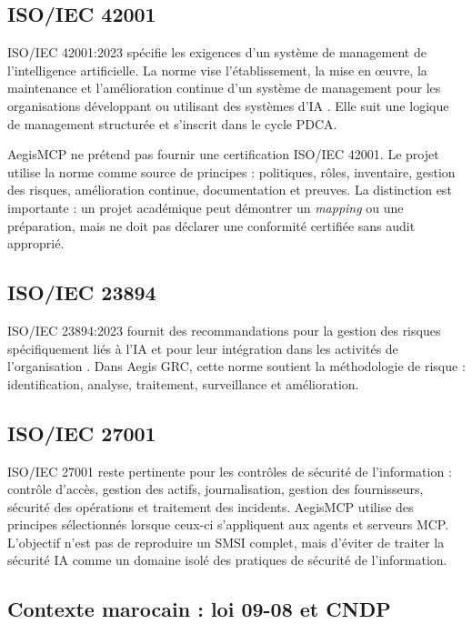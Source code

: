 \subsection{ISO/IEC 42001}

ISO/IEC 42001:2023 spécifie les exigences d'un système de management de l'intelligence artificielle. La norme vise l'établissement, la mise en œuvre, la maintenance et l'amélioration continue d'un système de management pour les organisations développant ou utilisant des systèmes d'IA \cite{iso42001}. Elle suit une logique de management structurée et s'inscrit dans le cycle PDCA.

AegisMCP ne prétend pas fournir une certification ISO/IEC 42001. Le projet utilise la norme comme source de principes : politiques, rôles, inventaire, gestion des risques, amélioration continue, documentation et preuves. La distinction est importante : un projet académique peut démontrer un \emph{mapping} ou une préparation, mais ne doit pas déclarer une conformité certifiée sans audit approprié.

\subsection{ISO/IEC 23894}

ISO/IEC 23894:2023 fournit des recommandations pour la gestion des risques spécifiquement liés à l'IA et pour leur intégration dans les activités de l'organisation \cite{iso23894}. Dans Aegis GRC, cette norme soutient la méthodologie de risque : identification, analyse, traitement, surveillance et amélioration.

\subsection{ISO/IEC 27001}

ISO/IEC 27001 reste pertinente pour les contrôles de sécurité de l'information : contrôle d'accès, gestion des actifs, journalisation, gestion des fournisseurs, sécurité des opérations et traitement des incidents. AegisMCP utilise des principes sélectionnés lorsque ceux-ci s'appliquent aux agents et serveurs MCP. L'objectif n'est pas de reproduire un SMSI complet, mais d'éviter de traiter la sécurité IA comme un domaine isolé des pratiques de sécurité de l'information.

\subsection{Contexte marocain : loi 09-08 et CNDP}

